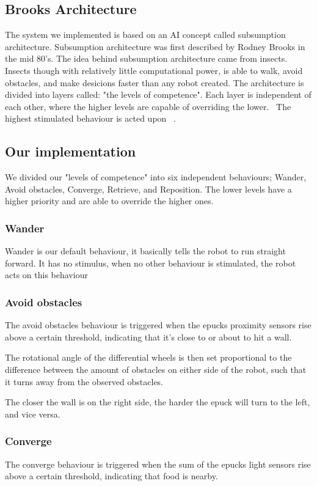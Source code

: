 \documentclass[a4paper]{article}
\begin{document}
\subsection{Brooks Architecture}
The system we implemented is based on an AI concept called subsumption architecture.
Subsumption architecture was first described by Rodney Brooks in the mid 80's.
The idea behind subsumption architecture came from insects.
Insects though with relatively little computational power, is able to walk, avoid obstacles, and make desicions faster than any robot created.
The architecture is divided into layers called: "the levels of competence".
Each layer is  independent of each other, where the higher levels are capable of overriding the lower.~\cite{mwarnerwu}
The highest stimulated behaviour is acted upon ~\cite{berg-karud}.

\subsection{Our implementation}
We divided our "levels of competence" into six independent behaviours; Wander, Avoid obstacles, Converge, Retrieve, and Reposition.
The lower levels have a higher priority and are able to override the higher ones.


\subsubsection{Wander}
Wander is our default behaviour, it basically tells the robot to run straight forward.
It has no stimulus, when no other behaviour is stimulated, the robot acts on this behaviour

\subsubsection{Avoid obstacles}
The avoid obstacles behaviour is triggered when the epucks proximity sensors rise above a certain threshold, indicating that it's close to or about to hit a wall.

The rotational angle of the differential wheels is then set proportional to the difference between the amount of obstacles on either side of the robot, such that it turns away from the observed obstacles.

The closer the wall is on the right side, the harder the epuck will turn to the left, and vice versa.

\subsubsection{Converge}
The converge behaviour is triggered when the sum of the epucks light sensors rise above a certain threshold, indicating that food is nearby.
\end{document}
